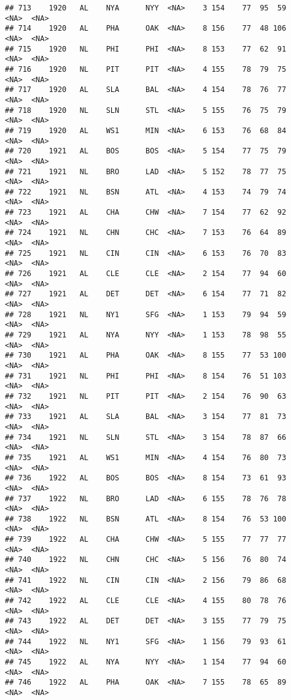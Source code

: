 \documentclass[]{article}
\begin{document}
\begin{verbatim}
## 713    1920   AL    NYA      NYY  <NA>    3 154    77  95  59   <NA>  <NA>
## 714    1920   AL    PHA      OAK  <NA>    8 156    77  48 106   <NA>  <NA>
## 715    1920   NL    PHI      PHI  <NA>    8 153    77  62  91   <NA>  <NA>
## 716    1920   NL    PIT      PIT  <NA>    4 155    78  79  75   <NA>  <NA>
## 717    1920   AL    SLA      BAL  <NA>    4 154    78  76  77   <NA>  <NA>
## 718    1920   NL    SLN      STL  <NA>    5 155    76  75  79   <NA>  <NA>
## 719    1920   AL    WS1      MIN  <NA>    6 153    76  68  84   <NA>  <NA>
## 720    1921   AL    BOS      BOS  <NA>    5 154    77  75  79   <NA>  <NA>
## 721    1921   NL    BRO      LAD  <NA>    5 152    78  77  75   <NA>  <NA>
## 722    1921   NL    BSN      ATL  <NA>    4 153    74  79  74   <NA>  <NA>
## 723    1921   AL    CHA      CHW  <NA>    7 154    77  62  92   <NA>  <NA>
## 724    1921   NL    CHN      CHC  <NA>    7 153    76  64  89   <NA>  <NA>
## 725    1921   NL    CIN      CIN  <NA>    6 153    76  70  83   <NA>  <NA>
## 726    1921   AL    CLE      CLE  <NA>    2 154    77  94  60   <NA>  <NA>
## 727    1921   AL    DET      DET  <NA>    6 154    77  71  82   <NA>  <NA>
## 728    1921   NL    NY1      SFG  <NA>    1 153    79  94  59   <NA>  <NA>
## 729    1921   AL    NYA      NYY  <NA>    1 153    78  98  55   <NA>  <NA>
## 730    1921   AL    PHA      OAK  <NA>    8 155    77  53 100   <NA>  <NA>
## 731    1921   NL    PHI      PHI  <NA>    8 154    76  51 103   <NA>  <NA>
## 732    1921   NL    PIT      PIT  <NA>    2 154    76  90  63   <NA>  <NA>
## 733    1921   AL    SLA      BAL  <NA>    3 154    77  81  73   <NA>  <NA>
## 734    1921   NL    SLN      STL  <NA>    3 154    78  87  66   <NA>  <NA>
## 735    1921   AL    WS1      MIN  <NA>    4 154    76  80  73   <NA>  <NA>
## 736    1922   AL    BOS      BOS  <NA>    8 154    73  61  93   <NA>  <NA>
## 737    1922   NL    BRO      LAD  <NA>    6 155    78  76  78   <NA>  <NA>
## 738    1922   NL    BSN      ATL  <NA>    8 154    76  53 100   <NA>  <NA>
## 739    1922   AL    CHA      CHW  <NA>    5 155    77  77  77   <NA>  <NA>
## 740    1922   NL    CHN      CHC  <NA>    5 156    76  80  74   <NA>  <NA>
## 741    1922   NL    CIN      CIN  <NA>    2 156    79  86  68   <NA>  <NA>
## 742    1922   AL    CLE      CLE  <NA>    4 155    80  78  76   <NA>  <NA>
## 743    1922   AL    DET      DET  <NA>    3 155    77  79  75   <NA>  <NA>
## 744    1922   NL    NY1      SFG  <NA>    1 156    79  93  61   <NA>  <NA>
## 745    1922   AL    NYA      NYY  <NA>    1 154    77  94  60   <NA>  <NA>
## 746    1922   AL    PHA      OAK  <NA>    7 155    78  65  89   <NA>  <NA>

\end{verbatim}
\end{document}
